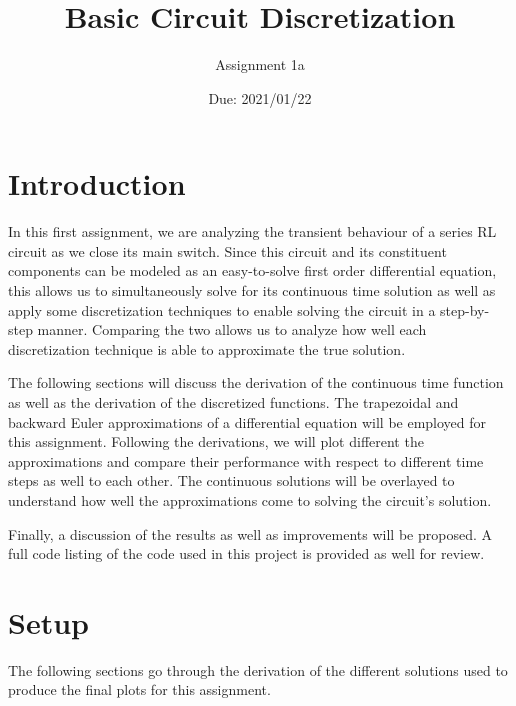 \documentclass[10pt, oneside, letterpaper]{article}
\title{Basic Circuit Discretization}
\author{Assignment 1a}
\date{Due: 2021/01/22}
\begin{document}
\maketitle
\thispagestyle{fancy}

\section{Introduction}
In this first assignment, we are analyzing the transient behaviour of a series RL circuit as we close its main switch. Since this circuit and its constituent components can be modeled as an easy-to-solve first order differential equation, this allows us to simultaneously solve for its continuous time solution as well as apply some discretization techniques to enable solving the circuit in a step-by-step manner. Comparing the two allows us to analyze how well each discretization technique is able to approximate the true solution.

The following sections will discuss the derivation of the continuous time function as well as the derivation of the discretized functions. The trapezoidal and backward Euler approximations of a differential equation will be employed for this assignment. Following the derivations, we will plot different the approximations and compare their performance with respect to different time steps as well to each other. The continuous solutions will be overlayed to understand how well the approximations come to solving the circuit's solution.

Finally, a discussion of the results as well as improvements will be proposed. A full code listing of the code used in this project is provided as well for review.
\section{Setup}
The following sections go through the derivation of the different solutions used to produce the final plots for this assignment.
\end{document}
